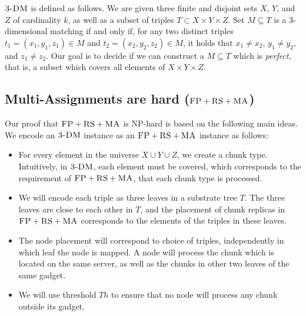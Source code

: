 \documentclass[9pt]{sigcomm-alternate}
\newcommand{\FP}{\textsc{FP}}
\newcommand{\RS}{\textsc{RS}}
\newcommand{\MA}{\textsc{MA}}
\newcommand{\Tree}{\ensuremath{T}}
\newcommand{\TDM}{\textsc{3-DM}}
\newcommand{\Thr}{\ensuremath{Th}}
\begin{document}
$\TDM$ is defined as follows. We are given three finite and disjoint
sets $X$, $Y$, and $Z$ of cardinality $k$, as well as a subset of triples $T\subset
X \times Y \times Z$.  Set $M \subseteq T$ is a 3-dimensional matching
if and only if, for any two distinct triples $t_1=(x_1, y_1, z_1) \in M$
and $t_2=(x_2, y_2, z_2) \in M$, it holds that $x_1\neq x_2$, $y_1\neq
y_2$, and $z_1\neq z_2$. Our goal is to decide if we can construct
a $M \subseteq T$ which is \emph{perfect}, that is, a subset which covers all
elements of $X \times Y \times Z$.


\subsection{Multi-Assignments are hard ($\FP+\RS+\MA$)}\label{ssec:fprsma}

Our proof that $\FP+\RS+\MA$ is NP-hard is based on the following main ideas.
We encode an $\TDM$ instance as an $\FP+\RS+\MA$ instance as follows:

 \begin{itemize}
 \item For every element in the universe $X\cup Y\cup
 Z$, we create a chunk type. Intuitively, in $\TDM$,
 each element must be covered, which corresponds to the requirement
 of $\FP+\RS+\MA$,
 that each chunk type is processed.

 \item We will encode each triple as three leaves in
 a substrate tree $\Tree$. The three leaves are close to each
 other in $\Tree$, and the placement of chunk replicas in $\FP+\RS+\MA$
 corresponds to the elements of the
 triples in these leaves.

 \item The node placement will correspond to choice of triples,
 independently in which leaf the node is mapped.
 A node will process the chunk which is located on the same server,
 as well as the chunks in other two leaves of the same gadget.

\item We will use threshold $\Thr$  to ensure that no node
will process
any chunk outside its gadget.
\end{itemize}
\end{document}
